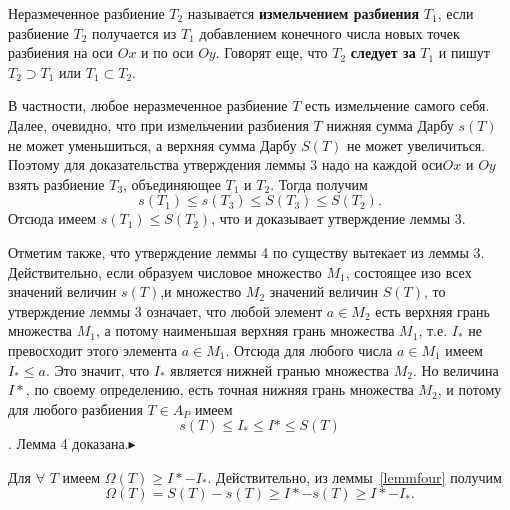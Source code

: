 \begin{object} 
Неразмеченное разбиение $T_2$ называется \textbf{измельчением разбиения} $T_1$, если разбиение $T_2$ получается из $T_1$ добавлением конечного числа новых точек разбиения на оси $Ox$ и по оси $Oy$. Говорят еще, что $T_2$ \textbf{следует за} $T_1$ и пишут $T_2\supset T_1$ или $T_1\subset T_2$. 
\end{object}
\par В частности, любое неразмеченное разбиение $T$ есть измельчение самого себя. Далее, очевидно, что при измельчении разбиения $T$ нижняя сумма Дарбу $s(T)$ не может уменьшиться, а верхняя сумма Дарбу $S(T)$ не может увеличиться. Поэтому для доказательства утверждения леммы 3 надо на каждой оси$Ox$ и $Oy$ взять разбиение $T_3$, объединяющее $T_1$ и $T_2$. Тогда получим $$s(T_1)\le s(T_3)\le S(T_3)\le S(T_2).$$ Отсюда имеем $s(T_1)\le S(T_2)$, что и доказывает утверждение леммы 3.
\par Отметим также, что утверждение леммы 4 по существу вытекает из леммы 3. Действительно, если образуем числовое множество $M_1$, состоящее изо всех значений величин $s(T)$,и множество $M_2$ значений величин $S(T)$, то утверждение леммы 3 означает, что любой элемент $a\in M_2$ есть верхняя грань множества $M_1$, а потому наименьшая верхняя грань множества $M_1$, т.е. $I_{*}$ не превосходит этого элемента $a\in M_1$. Отсюда для любого числа $a\in M_1$ имеем $I_{*}\le a$. Это значит, что $I_{*}$ является нижней гранью множества $M_2$. Но величина $I*$, по своему определению, есть точная нижняя грань множества $M_2$, и потому для любого разбиения $T\in A_P$ имеем $$s(T)\le I_{*}\le I*\le S(T)$$. Лемма 4 доказана.$\blacktriangleright$
\begin{lemma} 
Для $\forall$ $T$ имеем $\Omega (T)\ge I*-I_{*}$. 
Действительно, из леммы~\ref{lemmfour} получим $$\Omega (T)=S(T)-s(T)\ge I*- s(T)\ge I*-I_{*}.$$      
\end{lemma}

